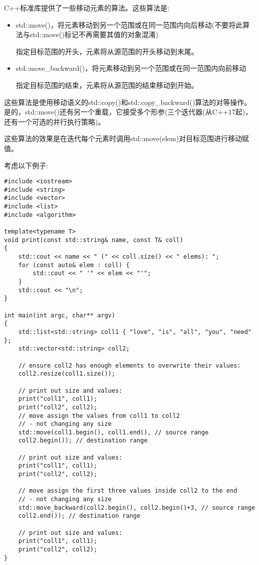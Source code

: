 C++标准库提供了一些移动元素的算法。这些算法是:\par

\begin{itemize}
	\item std::move()，将元素移动到另一个范围或在同一范围内向后移动(不要将此算法与std::move()标记不再需要其值的对象混淆)\par
	指定目标范围的开头，元素将从源范围的开头移动到末尾。
	\item std::move\_backward()，将元素移动到另一个范围或在同一范围内向前移动\par
	指定目标范围的结束，元素将从源范围的结束移动到开始。
\end{itemize}

这些算法是使用移动语义的std::copy()和std::copy\_backward()算法的对等操作。是的，std::move()还有另一个重载，它接受多个形参(三个迭代器(从C++17起)，还有一个可选的并行执行策略)。\par

这些算法的效果是在迭代每个元素时调用std::move(elem)对目标范围进行移动赋值。\par

考虑以下例子:\par

{\color{red}{lib/movealgo.cpp}}\par

\begin{lstlisting}[caption={}]
#include <iostream>
#include <string>
#include <vector>
#include <list>
#include <algorithm>

template<typename T>
void print(const std::string& name, const T& coll)
{
	std::cout << name << " (" << coll.size() << " elems): ";
	for (const auto& elem : coll) {
		std::cout << " '" << elem << "'";
	}
	std::cout << "\n";
}

int main(int argc, char** argv)
{
	std::list<std::string> coll1 { "love", "is", "all", "you", "need" };
	std::vector<std::string> coll2;
	
	// ensure coll2 has enough elements to overwrite their values:
	coll2.resize(coll1.size());
	
	// print out size and values:
	print("coll1", coll1);
	print("coll2", coll2);
	// move assign the values from coll1 to coll2
	// - not changing any size
	std::move(coll1.begin(), coll1.end(), // source range
	coll2.begin()); // destination range
	
	// print out size and values:
	print("coll1", coll1);
	print("coll2", coll2);
	
	// move assign the first three values inside coll2 to the end
	// - not changing any size
	std::move_backward(coll2.begin(), coll2.begin()+3, // source range
	coll2.end()); // destination range
	
	// print out size and values:
	print("coll1", coll1);
	print("coll2", coll2);
}
\end{lstlisting}

